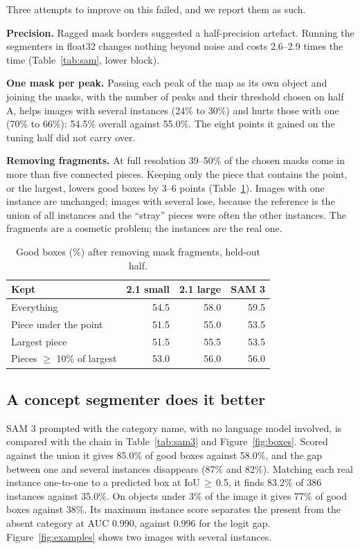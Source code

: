 \documentclass[10pt,twocolumn]{article}
\begin{document}
Three attempts to improve on this failed, and we report them as such.

\textbf{Precision.} Ragged mask borders suggested a half-precision artefact.
Running the segmenters in float32 changes nothing beyond noise and costs
2.6--2.9 times the time (Table~\ref{tab:sam}, lower block).

\textbf{One mask per peak.} Passing each peak of the map as its own object and
joining the masks, with the number of peaks and their threshold chosen on half
A, helps images with several instances (24\% to 30\%) and hurts those with one
(70\% to 66\%): 54.5\% overall against 55.0\%. The eight points it gained on
the tuning half did not carry over.

\textbf{Removing fragments.} At full resolution 39--50\% of the chosen masks
come in more than five connected pieces. Keeping only the piece that contains
the point, or the largest, lowers good boxes by 3--6 points
(Table~\ref{tab:clean}). Images with one instance are unchanged; images with
several lose, because the reference is the union of all instances and the
``stray'' pieces were often the other instances. The fragments are a cosmetic
problem; the instances are the real one.

\begin{table}[t]
\centering\small
\setlength{\tabcolsep}{4pt}
\begin{tabular}{lrrr}
\toprule
Kept & 2.1 small & 2.1 large & SAM 3 \\
\midrule
Everything & 54.5 & 58.0 & 59.5 \\
Piece under the point & 51.5 & 55.0 & 53.5 \\
Largest piece & 51.5 & 55.5 & 53.5 \\
Pieces $\geq$ 10\% of largest & 53.0 & 56.0 & 56.0 \\
\bottomrule
\end{tabular}
\caption{Good boxes (\%) after removing mask fragments, held-out half.}
\label{tab:clean}
\end{table}

\subsection{A concept segmenter does it better}
\label{sec:sam3}

SAM 3 prompted with the category name, with no language model involved, is
compared with the chain in Table~\ref{tab:sam3} and Figure~\ref{fig:boxes}.
Scored against the union it gives 85.0\% of good boxes against 58.0\%, and the
gap between one and several instances disappears (87\% and 82\%). Matching
each real instance one-to-one to a predicted box at IoU\,$\geq$\,0.5, it finds
83.2\% of 386 instances against 35.0\%. On objects under 3\% of the image it
gives 77\% of good boxes against 38\%. Its maximum instance score separates the
present from the absent category at AUC 0.990, against 0.996 for the logit gap.
Figure~\ref{fig:examples} shows two images with several instances.
\end{document}

